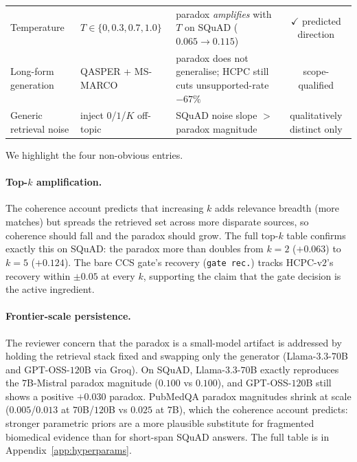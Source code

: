 \begin{table}[!htb]
\begin{tabular}{lllc}
Temperature             & $T \in \{0, 0.3, 0.7, 1.0\}$        & paradox \emph{amplifies} with $T$ on SQuAD ($0.065 \to 0.115$)      & $\checkmark$ predicted direction \\
Long-form generation    & QASPER + MS-MARCO                   & paradox does not generalise; HCPC still cuts unsupported-rate $-67\%$ & \dag{} scope-qualified \\
Generic retrieval noise & inject $0$/$1$/$K$ off-topic        & SQuAD noise slope $> $ paradox magnitude                            & \dag{} qualitatively distinct only \\
\bottomrule
\end{tabular}
\end{table}

We highlight the four non-obvious entries.

\paragraph{Top-$k$ amplification.}

The coherence account predicts that increasing $k$ adds relevance
breadth (more matches) but spreads the retrieved set across more
disparate sources, so coherence should fall and the paradox should
grow. The full top-$k$ table confirms exactly this on SQuAD: the
paradox more than doubles from $k{=}2$ ($+0.063$) to $k{=}5$
($+0.124$). The bare CCS gate's recovery (\texttt{gate rec.}) tracks
HCPC-v$2$'s recovery within $\pm 0.05$ at every $k$, supporting the
claim that the gate decision is the active ingredient.

\paragraph{Frontier-scale persistence.}
The reviewer concern that the paradox is a small-model artifact is
addressed by holding the retrieval stack fixed and swapping only the
generator (Llama-$3.3$-$70$B and GPT-OSS-$120$B via Groq). On SQuAD,
Llama-$3.3$-$70$B exactly reproduces the $7$B-Mistral paradox magnitude
($0.100$ vs $0.100$), and GPT-OSS-$120$B still shows a positive
$+0.030$ paradox. PubMedQA paradox magnitudes shrink at scale
($0.005$/$0.013$ at $70$B/$120$B vs $0.025$ at $7$B), which the
coherence account predicts: stronger parametric priors are a more
plausible substitute for fragmented biomedical evidence than for
short-span SQuAD answers. The full table is in
Appendix~\ref{app:hyperparams}.

